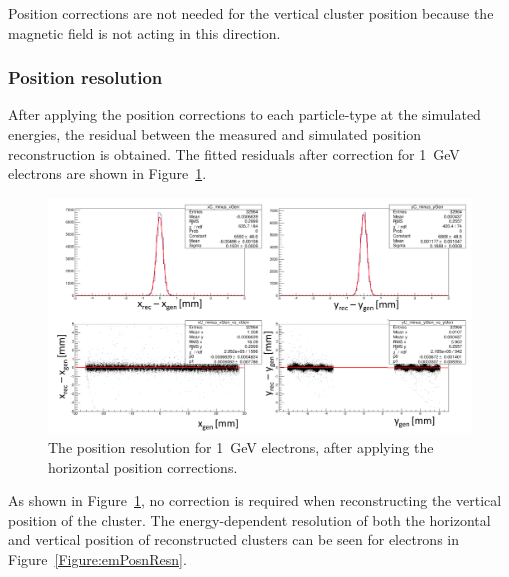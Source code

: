 \documentclass[12pt]{report}
\begin{document}
Position corrections are not needed for the vertical cluster position because the magnetic field is not acting in this direction. 

\subsubsection{Position resolution}

After applying the position corrections to each particle-type at the simulated energies, the residual between the measured and simulated position reconstruction is obtained. The fitted residuals after correction for 1~GeV electrons are shown in Figure~\ref{Figure:corrPosnsFits}.

\begin{figure}[H]
  \centering
      \includegraphics[width=1.0\textwidth]{pics/performance/corrPosnsFits.png}
  \caption[Position resolution for 1~GeV electrons.]{The position resolution for 1~GeV electrons, after applying the horizontal position corrections.}
  \label{Figure:corrPosnsFits}
\end{figure}

As shown in Figure~\ref{Figure:corrPosnsFits}, no correction is required when reconstructing the vertical position of the cluster. The energy-dependent resolution of both the horizontal and vertical position of reconstructed clusters can be seen for electrons in Figure~\ref{Figure:emPosnResn}. 
\end{document}

